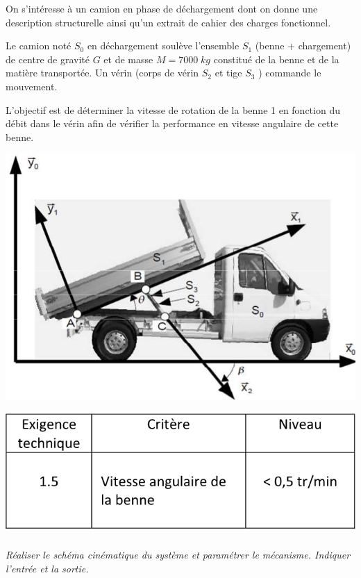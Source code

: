 \documentclass[10pt]{article}
\newif\ifprof
\begin{document}
\begin{minipage}[c]{.48\linewidth}
On s’intéresse à un camion en phase de déchargement dont on donne une description structurelle ainsi qu’un extrait de cahier des charges fonctionnel.  

Le camion noté $S_0$ en déchargement soulève l'ensemble $S_1$ (benne + chargement) de centre de gravité $G$ et de masse $M = 7000\; kg$ constitué de la benne et de la matière transportée. Un vérin (corps de vérin $S_2$ et tige $S_3$ ) commande le mouvement. 

L’objectif est de déterminer la vitesse de rotation de la benne 1 en fonction du débit dans le vérin afin de vérifier la performance en vitesse angulaire de cette benne. 

\end{minipage}
\hfill
\begin{minipage}[c]{.48\linewidth}
\begin{center}
\includegraphics[width=.9\textwidth]{images/Fig2}

\includegraphics[width=.9\textwidth]{images/Fig3}
\end{center}
\end{minipage}

\subparagraph{}
\textit{Réaliser le schéma cinématique du système et paramétrer le mécanisme. Indiquer l'entrée et la sortie.}
\ifprof
\begin{corrige}
\end{corrige}
\else
\fi
\end{document}
